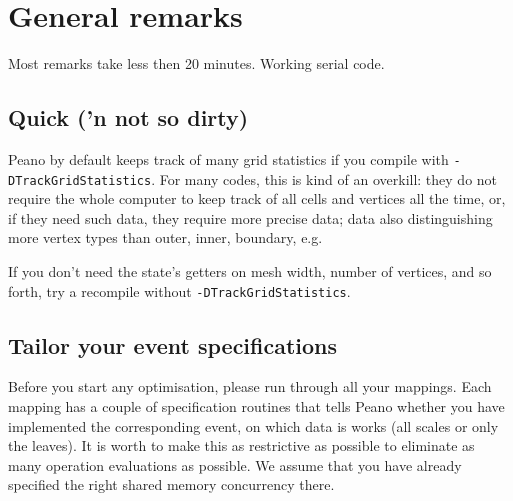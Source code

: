 \section{General remarks}

\chapterDescription
  {
    Most remarks take less then 20 minutes.
  }
  {
    Working serial code.
  }


\subsection{Quick ('n not so dirty)}

\noindent
Peano by default keeps track of many grid statistics if you compile with
\texttt{-DTrackGridStatistics}.
For many codes, this is kind of an overkill: they do not require the whole
computer to keep track of all cells and vertices all the time, or, if they need
such data, they require more precise data; data also distinguishing more vertex
types than outer, inner, boundary, e.g.

If you don't need the state's getters on mesh width, number of vertices, and so
forth, try a recompile without \texttt{-DTrackGridStatistics}.


\subsection{Tailor your event specifications}

Before you start any optimisation, please run through all your mappings. 
Each mapping has a couple of specification routines that tells Peano whether
you have implemented the corresponding event, on which data is works (all
scales or only the leaves).
It is worth to make this as restrictive as possible to eliminate as many
operation evaluations as possible.
We assume that you have already specified the right shared memory concurrency
there.

